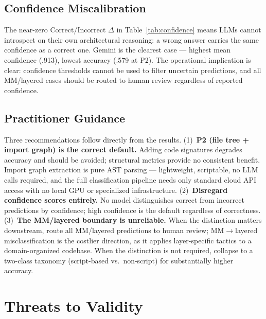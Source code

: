 \documentclass[runningheads]{llncs}
\begin{document}
\subsection{Confidence Miscalibration}

The near-zero Correct/Incorrect $\Delta$ in Table~\ref{tab:confidence} means LLMs cannot introspect on their own architectural reasoning: a wrong answer carries the same confidence as a correct one. Gemini is the clearest case --- highest mean confidence (.913), lowest accuracy (.579 at P2). The operational implication is clear: confidence thresholds cannot be used to filter uncertain predictions, and all MM/layered cases should be routed to human review regardless of reported confidence.

\subsection{Practitioner Guidance}

Three recommendations follow directly from the results. (1)~\textbf{P2 (file tree + import graph) is the correct default.} Adding code signatures degrades accuracy and should be avoided; structural metrics provide no consistent benefit. Import graph extraction is pure AST parsing --- lightweight, scriptable, no LLM calls required, and the full classification pipeline needs only standard cloud API access with no local GPU or specialized infrastructure. (2)~\textbf{Disregard confidence scores entirely.} No model distinguishes correct from incorrect predictions by confidence; high confidence is the default regardless of correctness. (3)~\textbf{The MM/layered boundary is unreliable.} When the distinction matters downstream, route all MM/layered predictions to human review; MM$\to$layered misclassification is the costlier direction, as it applies layer-specific tactics to a domain-organized codebase. When the distinction is not required, collapse to a two-class taxonomy (script-based vs.\ non-script) for substantially higher accuracy.

\section{Threats to Validity}
\label{sec:threats}
\end{document}
